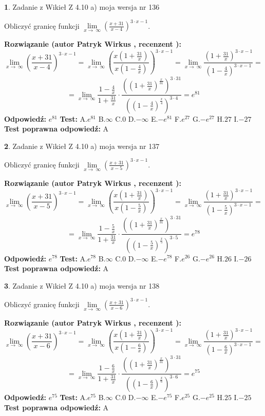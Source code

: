 \documentclass[12pt, a4paper]{article}
\theoremstyle{definition} %
\newtheorem{zad}{}
\newcommand{\zadStart}[1]{\begin{zad}#1\newline}
\newcommand{\zadStop}{\end{zad}}
\newcommand{\rozwStart}[2]{\noindent \textbf{Rozwiązanie (autor #1 , recenzent #2): }\newline}
\newcommand{\rozwStop}{\newline}
\newcommand{\odpStart}{\noindent \textbf{Odpowiedź:}\newline}
\newcommand{\odpStop}{\newline}
\newcommand{\testStart}{\noindent \textbf{Test:}\newline}
\newcommand{\testStop}{\newline}
\newcommand{\kluczStart}{\noindent \textbf{Test poprawna odpowiedź:}\newline}
\newcommand{\kluczStop}{\newline}
\begin{document}
\zadStart{Zadanie z Wikieł Z 4.10 a) moja wersja nr 136}

Obliczyć granicę funkcji  $\lim\limits_{x\to\ \infty}(\frac{x+31}{x-4})^{3\cdot x-1}$.
\zadStop
\rozwStart{Patryk Wirkus}{}
$$\lim\limits_{x\to\ \infty}(\frac{x+31}{x-4})^{3\cdot x-1} = \lim\limits_{x\to\ \infty}(\frac{x(1+\frac{31}{x})}{x(1-\frac{4}{x})})^{3\cdot x-1}=\lim\limits_{x\to\ \infty}\frac{(1+\frac{31}{x})^{3\cdot x-1}}{(1-\frac{4}{x})^{3\cdot x-1}}=$$
$$=\lim\limits_{x\to\ \infty}\frac{1-\frac{4}{x}}{1+\frac{31}{x}}\cdot\frac{((1+\frac{31}{x})^{\frac{x}{31}})^{3\cdot31}}{((1-\frac{4}{x})^{\frac{x}{4}})^{3\cdot4}}=e^{81}$$
\rozwStop
\odpStart
$e^{81}$
\odpStop
\testStart
A.$e^{81}$ B.$\infty$ C.$0$ D.$-\infty$ E.$-e^{81}$
F.$e^{27}$ G.$-e^{27}$
H.$27$
I.$-27$
\testStop
\kluczStart
A
\kluczStop



\zadStart{Zadanie z Wikieł Z 4.10 a) moja wersja nr 137}

Obliczyć granicę funkcji  $\lim\limits_{x\to\ \infty}(\frac{x+31}{x-5})^{3\cdot x-1}$.
\zadStop
\rozwStart{Patryk Wirkus}{}
$$\lim\limits_{x\to\ \infty}(\frac{x+31}{x-5})^{3\cdot x-1} = \lim\limits_{x\to\ \infty}(\frac{x(1+\frac{31}{x})}{x(1-\frac{5}{x})})^{3\cdot x-1}=\lim\limits_{x\to\ \infty}\frac{(1+\frac{31}{x})^{3\cdot x-1}}{(1-\frac{5}{x})^{3\cdot x-1}}=$$
$$=\lim\limits_{x\to\ \infty}\frac{1-\frac{5}{x}}{1+\frac{31}{x}}\cdot\frac{((1+\frac{31}{x})^{\frac{x}{31}})^{3\cdot31}}{((1-\frac{5}{x})^{\frac{x}{5}})^{3\cdot5}}=e^{78}$$
\rozwStop
\odpStart
$e^{78}$
\odpStop
\testStart
A.$e^{78}$ B.$\infty$ C.$0$ D.$-\infty$ E.$-e^{78}$
F.$e^{26}$ G.$-e^{26}$
H.$26$
I.$-26$
\testStop
\kluczStart
A
\kluczStop



\zadStart{Zadanie z Wikieł Z 4.10 a) moja wersja nr 138}

Obliczyć granicę funkcji  $\lim\limits_{x\to\ \infty}(\frac{x+31}{x-6})^{3\cdot x-1}$.
\zadStop
\rozwStart{Patryk Wirkus}{}
$$\lim\limits_{x\to\ \infty}(\frac{x+31}{x-6})^{3\cdot x-1} = \lim\limits_{x\to\ \infty}(\frac{x(1+\frac{31}{x})}{x(1-\frac{6}{x})})^{3\cdot x-1}=\lim\limits_{x\to\ \infty}\frac{(1+\frac{31}{x})^{3\cdot x-1}}{(1-\frac{6}{x})^{3\cdot x-1}}=$$
$$=\lim\limits_{x\to\ \infty}\frac{1-\frac{6}{x}}{1+\frac{31}{x}}\cdot\frac{((1+\frac{31}{x})^{\frac{x}{31}})^{3\cdot31}}{((1-\frac{6}{x})^{\frac{x}{6}})^{3\cdot6}}=e^{75}$$
\rozwStop
\odpStart
$e^{75}$
\odpStop
\testStart
A.$e^{75}$ B.$\infty$ C.$0$ D.$-\infty$ E.$-e^{75}$
F.$e^{25}$ G.$-e^{25}$
H.$25$
I.$-25$
\testStop
\kluczStart
A
\kluczStop
\end{document}
